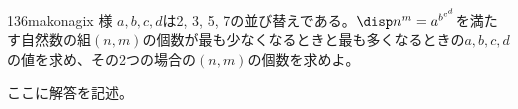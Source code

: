 \begin{prob}{136}{}{makonagix 様}
 $a, b, c, d$は2, 3, 5, 7の並び替えである。$\disp n^m=a^{b^{c^d}}$を満たす自然数の組$(n,m)$の個数が最も少なくなるときと最も多くなるときの$a, b, c, d$の値を求め、その2つの場合の$(n,m)$の個数を求めよ。
\end{prob}
ここに解答を記述。